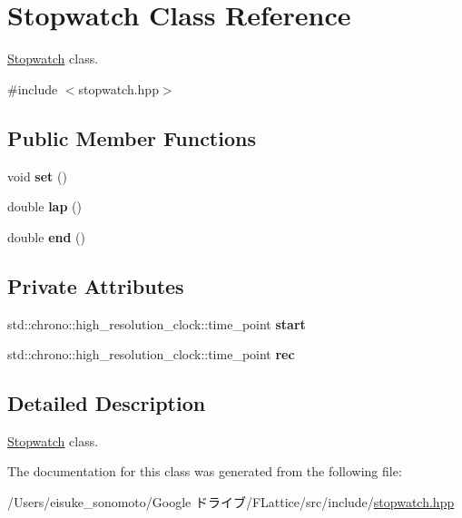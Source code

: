 \hypertarget{class_stopwatch}{}\section{Stopwatch Class Reference}
\label{class_stopwatch}


\mbox{\hyperlink{class_stopwatch}{Stopwatch}} class.  




{\ttfamily \#include $<$stopwatch.\+hpp$>$}

\subsection*{Public Member Functions}
\begin{DoxyCompactItemize}
\item 
\mbox{\label{class_stopwatch_aa58180166145ff2ee3340acf0a1b7f32}} 
void {\bfseries set} ()
\item 
\mbox{\label{class_stopwatch_a8e696ad9d0a92bafbccea81ff317da91}} 
double {\bfseries lap} ()
\item 
\mbox{\label{class_stopwatch_abf9e598738519353a858e962a4dd71a3}} 
double {\bfseries end} ()
\end{DoxyCompactItemize}
\subsection*{Private Attributes}
\begin{DoxyCompactItemize}
\item 
\mbox{\label{class_stopwatch_aedd5e689676ffd17b95e71a876f35a3b}} 
std\+::chrono\+::high\+\_\+resolution\+\_\+clock\+::time\+\_\+point {\bfseries start}
\item 
\mbox{\label{class_stopwatch_ac4b795adfe881690f1d2cd4760f28da1}} 
std\+::chrono\+::high\+\_\+resolution\+\_\+clock\+::time\+\_\+point {\bfseries rec}
\end{DoxyCompactItemize}


\subsection{Detailed Description}
\mbox{\hyperlink{class_stopwatch}{Stopwatch}} class. 

The documentation for this class was generated from the following file\+:\begin{DoxyCompactItemize}
\item 
/\+Users/eisuke\+\_\+sonomoto/\+Google ドライブ/\+F\+Lattice/src/include/\mbox{\hyperlink{stopwatch_8hpp}{stopwatch.\+hpp}}\end{DoxyCompactItemize}
